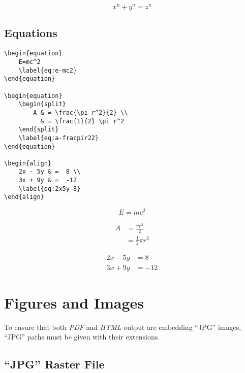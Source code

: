 \[x^n + y^n = z^n\]

\subsection*{Equations}
\label{subsec:equations}

\begin{lstlisting}[caption={Equations.}]
\begin{equation}
    E=mc^2
    \label{eq:e-mc2}
\end{equation}

\begin{equation}
    \begin{split}
        A & = \frac{\pi r^2}{2} \\
          & = \frac{1}{2} \pi r^2
    \end{split}
    \label{eq:a-fracpir22}
\end{equation}

\begin{align}
    2x - 5y & =  8 \\
    3x + 9y & =  -12
    \label{eq:2x5y-8}
\end{align}
\end{lstlisting}

\begin{equation}
    E=mc^2
    \label{eq:e-mc2}
\end{equation}

\begin{equation}
    \begin{split}
        A & = \frac{\pi r^2}{2} \\
          & = \frac{1}{2} \pi r^2
    \end{split}
    \label{eq:a-fracpir22}
\end{equation}

\begin{align}
    2x - 5y & =  8 \\
    3x + 9y & =  -12
    \label{eq:2x5y-8}
\end{align}

\section*{Figures and Images}
\label{sec:figures-and-images}

To ensure that both \textit{PDF} and \textit{HTML} output are embedding
``JPG'' images, ``JPG'' paths must be given with their extensions.

\subsection*{``JPG'' Raster File}
\label{subsec:jpg-raster-file}

